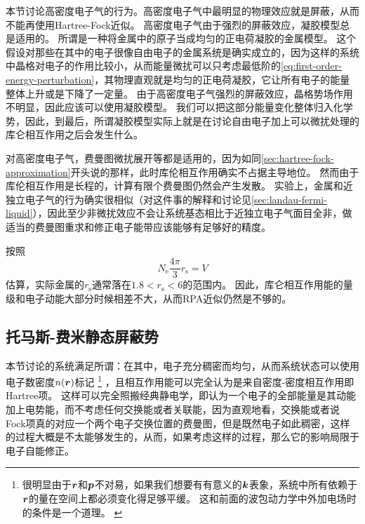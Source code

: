 本节讨论高密度电子气的行为。高密度电子气中最明显的物理效应就是屏蔽，从而不能再使用Hartree-Fock近似。
高密度电子气由于强烈的屏蔽效应，凝胶模型总是适用的。
所谓是一种将金属中的原子当成均匀的正电荷凝胶的金属模型。
这个假设对那些在其中的电子很像自由电子的金属系统是确实成立的，因为这样的系统中晶格对电子的作用比较小，从而能量微扰可以只考虑最低阶的\eqref{eq:first-order-energy-perturbation}，其物理直观就是均匀的正电荷凝胶，它让所有电子的能量整体上升或是下降了一定量。
由于高密度电子气强烈的屏蔽效应，晶格势场作用不明显，因此应该可以使用凝胶模型。
我们可以把这部分能量变化整体归入化学势，因此，到最后，所谓凝胶模型实际上就是在讨论自由电子加上可以微扰处理的库仑相互作用之后会发生什么。

对高密度电子气，费曼图微扰展开等都是适用的，因为如同\autoref{sec:hartree-fock-approximation}开头说的那样，此时库伦相互作用确实不占据主导地位。
然而由于库伦相互作用是长程的，计算有限个费曼图仍然会产生发散。
实验上，金属和近独立电子气的行为确实很相似（对这件事的解释和讨论见\autoref{sec:landau-fermi-liquid}），因此至少非微扰效应不会让系统基态相比于近独立电子气面目全非，做适当的费曼图重求和修正电子能带应该能够有足够好的精度。

按照
\[
    N_\text{e} \frac{4\pi}{3} r_\text{s} = V
\]
估算，实际金属的$r_\text{s}$通常落在$1.8 < r_\text{s} < 6$的范围内。
因此，库仑相互作用能的量级和电子动能大部分时候相差不大，从而RPA近似仍然是不够的。

\subsection{托马斯-费米静态屏蔽势}\label{sec:ext-e}

本节讨论的系统满足所谓：在其中，电子充分稠密而均匀，从而系统状态可以使用电子数密度$n(\vb*{r})$标记%
\footnote{
    很明显由于$\vb*{r}$和$\vb*{p}$不对易，如果我们想要有有意义的$\vb*{k}$表象，系统中所有依赖于$\vb*{r}$的量在空间上都必须变化得足够平缓。
    这和前面的波包动力学中外加电场时的条件是一个道理。
    \label{note:smooth-electron-distribution}
}%
，且相互作用能可以完全认为是来自密度-密度相互作用即Hartree项。
这样可以完全照搬经典静电学，即认为一个电子的全部能量是其动能加上电势能，而不考虑任何交换能或者关联能，因为直观地看，交换能或者说Fock项真的对应一个两个电子交换位置的费曼图，但是既然电子如此稠密，这样的过程大概是不太能够发生的，从而，如果考虑这样的过程，那么它的影响局限于电子自能修正。

